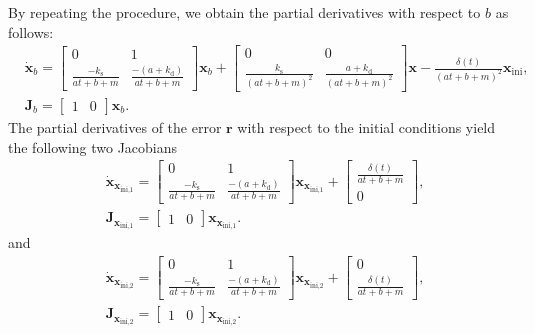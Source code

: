 By repeating the procedure, we obtain the partial derivatives with respect to $b$ as follows: 
\begin{equation} \begin{aligned} 
    & \dot{\mathbf{x}}_b = \begin{bmatrix} 0 & 1 \\ \frac{-k_{\mathrm{s}}}{a t + b + m} & \frac{-(a + k_{\mathrm{d}})}{a t + b + m} \end{bmatrix} \mathbf{x}_b 
    + \begin{bmatrix} 0 & 0 \\ \frac{k_{\mathrm{s}}}{(a t + b + m)^2} & \frac{a+k_{\mathrm{d}}}{(a t + b + m)^2} \end{bmatrix} \mathbf{x} 
 - \frac{\delta(t) }{(a t + b + m)^2}  \mathbf{x}_{\text{ini}} ,
 \\ & \mathbf{J}_b = \begin{bmatrix} 1 & 0 \end{bmatrix} \mathbf{x}_b . 
\end{aligned} \end{equation}
The partial derivatives of the error $\mathbf{r}$ with respect to the initial conditions yield the following two Jacobians
\begin{equation} \begin{aligned}
    & \dot{\mathbf{x}}_{\mathbf{x}_{\text{ini,1}}} = \begin{bmatrix} 0 & 1 \\ \frac{-k_{\mathrm{s}}}{a t + b + m} & \frac{-(a + k_{\mathrm{d}})}{a t + b + m} \end{bmatrix} \mathbf{x}_{\mathbf{x}_{\text{ini,1}}} + \begin{bmatrix} \frac{\delta(t)}{a t + b + m} \\ 0 \end{bmatrix} , \\
    & \mathbf{J}_{\mathbf{x}_{\text{ini,1}}} = \begin{bmatrix} 1 & 0 \end{bmatrix} \mathbf{x}_{\mathbf{x}_{\text{ini,1}}}.
\end{aligned} \end{equation}
and
\begin{equation} \begin{aligned}
    & \dot{\mathbf{x}}_{\mathbf{x}_{\text{ini,2}}} = \begin{bmatrix} 0 & 1 \\ \frac{-k_{\mathrm{s}}}{a t + b + m} & \frac{-(a+k_{\mathrm{d}})}{a t + b + m} \end{bmatrix} \mathbf{x}_{\mathbf{x}_{\text{ini,2}}} + \begin{bmatrix} 0 \\ \frac{\delta(t)}{a t + b + m} \end{bmatrix} ,  \\
    & \mathbf{J}_{\mathbf{x}_{\text{ini,2}}}=\begin{bmatrix} 1 & 0 \end{bmatrix} \mathbf{x}_{\mathbf{x}_{\text{ini,2}}}.
\end{aligned} \end{equation}

